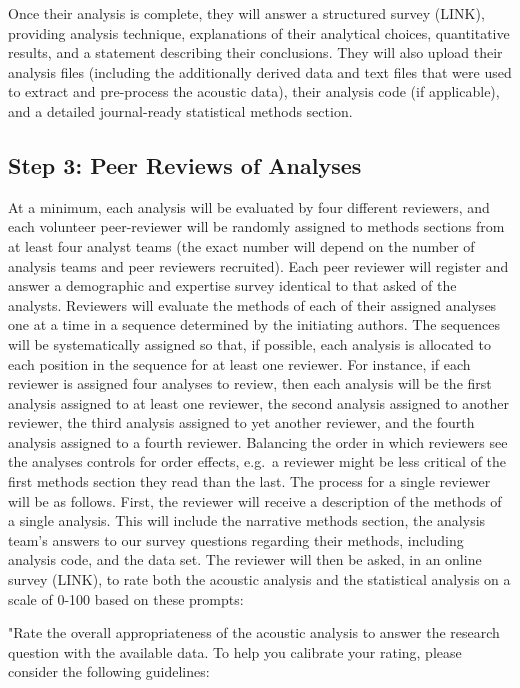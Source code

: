 \documentclass[
  english,
  man,floatsintext]{apa6}
\begin{document}
Once their analysis is complete, they will answer a structured survey (LINK), providing analysis technique, explanations of their analytical choices, quantitative results, and a statement describing their conclusions.
They will also upload their analysis files (including the additionally derived data and text files that were used to extract and pre-process the acoustic data), their analysis code (if applicable), and a detailed journal-ready statistical methods section.

\hypertarget{step-3-peer-reviews-of-analyses}{%
\subsection{Step 3: Peer Reviews of Analyses}\label{step-3-peer-reviews-of-analyses}}

At a minimum, each analysis will be evaluated by four different reviewers, and each volunteer peer-reviewer will be randomly assigned to methods sections from at least four analyst teams (the exact number will depend on the number of analysis teams and peer reviewers recruited).
Each peer reviewer will register and answer a demographic and expertise survey identical to that asked of the analysts.
Reviewers will evaluate the methods of each of their assigned analyses one at a time in a sequence determined by the initiating authors.
The sequences will be systematically assigned so that, if possible, each analysis is allocated to each position in the sequence for at least one reviewer.
For instance, if each reviewer is assigned four analyses to review, then each analysis will be the first analysis assigned to at least one reviewer, the second analysis assigned to another reviewer, the third analysis assigned to yet another reviewer, and the fourth analysis assigned to a fourth reviewer.
Balancing the order in which reviewers see the analyses controls for order effects, e.g.~a reviewer might be less critical of the first methods section they read than the last.
The process for a single reviewer will be as follows.
First, the reviewer will receive a description of the methods of a single analysis.
This will include the narrative methods section, the analysis team's answers to our survey questions regarding their methods, including analysis code, and the data set.
The reviewer will then be asked, in an online survey (LINK), to rate both the acoustic analysis and the statistical analysis on a scale of 0-100 based on these prompts:

"Rate the overall appropriateness of the acoustic analysis to answer the research question with the available data. To help you calibrate your rating, please consider the following guidelines:
\end{document}
